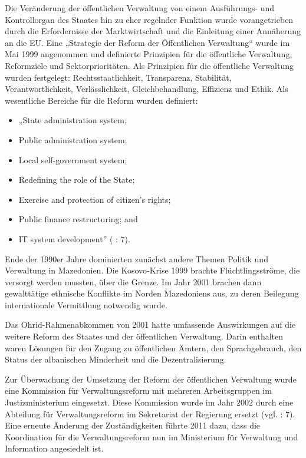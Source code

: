Die Veränderung der öffentlichen Verwaltung von einem Ausführungs- und Kontrollorgan des Staates hin zu eher regelnder Funktion wurde vorangetrieben durch die Erfordernisse der Marktwirtschaft und die Einleitung einer Annäherung an die EU. Eine „Strategie der Reform der Öffentlichen Verwaltung“ wurde im Mai 1999 angenommen und definierte Prinzipien für die öffentliche Verwaltung, Reformziele und Sektorprioritäten. Als Prinzipien für die öffentliche Verwaltung wurden festgelegt: Rechtsstaatlichkeit, Transparenz, Stabilität, Verantwortlichkeit, Verlässlichkeit, Gleichbehandlung, Effizienz und Ethik.
Als wesentliche Bereiche für die Reform wurden definiert:
\begin{itemize} \itemsep1pt \parskip0pt 
\item „State administration system;
\item Public administration system;
\item Local self-government system;
\item Redefining the role of the State;
\item Exercise and protection of citizen’s rights;
\item Public finance restructuring; and
\item IT system development” (\cite{analyt07} : 7).
\end{itemize}
Ende der 1990er Jahre dominierten zunächst andere Themen Politik und Verwaltung in Mazedonien. Die Kosovo-Krise 1999 brachte Flüchtlingsströme, die versorgt werden mussten, über die Grenze. Im Jahr 2001 brachen dann gewalttätige ethnische Konflikte im Norden Mazedoniens aus, zu deren Beilegung internationale Vermittlung notwendig wurde. \par
Das Ohrid-Rahmenabkommen von 2001 hatte umfassende Auswirkungen auf die weitere Reform des Staates und der öffentlichen Verwaltung. Darin enthalten waren Lösungen für den Zugang zu öffentlichen Ämtern, den Sprachgebrauch, den Status der albanischen Minderheit und die Dezentralisierung.\par
Zur Überwachung der Umsetzung der Reform der öffentlichen Verwaltung wurde eine Kommission für Verwaltungsreform mit mehreren Arbeitsgruppen im Justizministerium eingesetzt. Diese Kommission wurde im Jahr 2002 durch eine Abteilung für Verwaltungsreform im Sekretariat der Regierung ersetzt (vgl. \cite{analyt07} : 7). Eine erneute Änderung der Zuständigkeiten führte 2011 dazu, dass die Koordination für die Verwaltungsreform nun im Ministerium für Verwaltung und Information angesiedelt ist.\par

